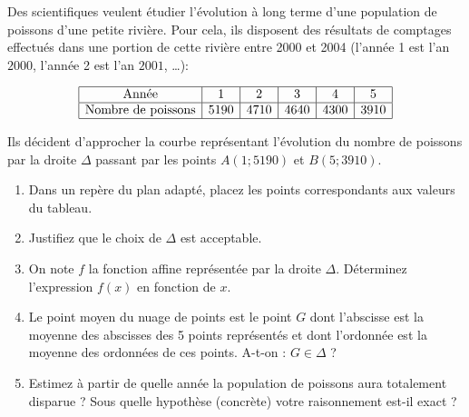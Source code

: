 \begin{exr}
Des scientifiques veulent étudier l'évolution à long terme d'une population de poissons d'une petite rivière. Pour cela, ils disposent des résultats de comptages effectués dans une portion de cette rivière entre 2000 et 2004 (l'année 1 est l'an $2000$, l'année 2 est l'an $2001$, \dots ): 
 
  $$\begin{array}{|c|c|c|c|c|c|}
  \hline
  \text{Année} & 1 & 2 & 3 & 4 & 5  \\ \hline
  \text{Nombre de poissons} & 5190 & 4710 & 4640 & 4300 & 3910  \\ \hline
  \end{array}$$
%
%
%       

\noindent Ils décident d'approcher la courbe représentant l'évolution du nombre de poissons par
 la droite $\Delta$ passant par les points $A(1;5190)$ et $B(5;3910)$.
  \begin{enumerate}
  \item Dans un repère du plan adapté, placez les points correspondants aux valeurs du tableau.
  \item Justifiez que le choix de $\Delta$ est acceptable.
  \item  On note $f$  la fonction affine représentée par  la droite $\Delta$.
Déterminez l'expression $f(x)$ en fonction de $x$.
  \item Le point moyen du nuage de points est le point $G$ dont l'abscisse est la moyenne
      des abscisses des 5 points représentés et dont l'ordonnée est la moyenne
      des ordonnées de ces points. A-t-on : $G \in \Delta$ ? 
  \item Estimez à partir de quelle année la population de poissons aura totalement disparue ? Sous quelle hypothèse (concrète) votre raisonnement est-il exact ?
  \end{enumerate}
\end{exr}
